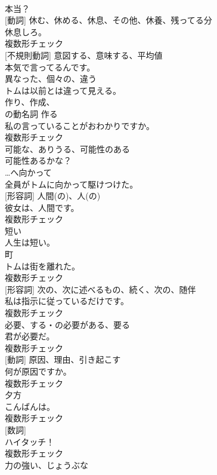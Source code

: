 \documentclass[8pt]{extreport}
\begin{document}
\begin{CJK}{UTF8}{min}
\\	本当？	
\\	[名詞] [動詞]	休む、休める、休息、その他、休養、残ってる分	
\\	休息しろ。	
\\	複数形チェック
\\	[動詞] [不規則動詞]	意図する、意味する、平均値	
\\	本気で言ってるんです。	
\\	[形容詞]	異なった、個々の、違う	
\\	トムは以前とは違って見える。	
\\	[名詞]	作り、作成、
\\	の動名詞 作る	
\\	私の言っていることがおわかりですか。	
\\	複数形チェック
\\	[形容詞]	可能な、ありうる、可能性のある	
\\	可能性あるかな？	
\\	[前置詞]	…へ向かって	
\\	全員がトムに向かって駆けつけた。	
\\	[名詞] [形容詞]	人間(の)、人(の)	
\\	彼女は、人間です。	
\\	複数形チェック
\\	[形容詞]	短い	
\\	人生は短い。	
\\	[名詞]	町	
\\	トムは街を離れた。	
\\	複数形チェック
\\	[名詞] [形容詞]	次の、次に述べるもの、続く、次の、随伴	
\\	私は指示に従っているだけです。	
\\	複数形チェック
\\	[名詞]	必要、する・の必要がある、要る	
\\	君が必要だ。	
\\	複数形チェック
\\	[名詞] [動詞]	原因、理由、引き起こす	
\\	何が原因ですか。	
\\	複数形チェック
\\	[名詞]	夕方	
\\	こんばんは。	
\\	複数形チェック
\\	[名詞] [数詞]	
\\	ハイタッチ！	
\\	複数形チェック
\\	[形容詞]	力の強い、じょうぶな	

\end{CJK}
\end{document}
